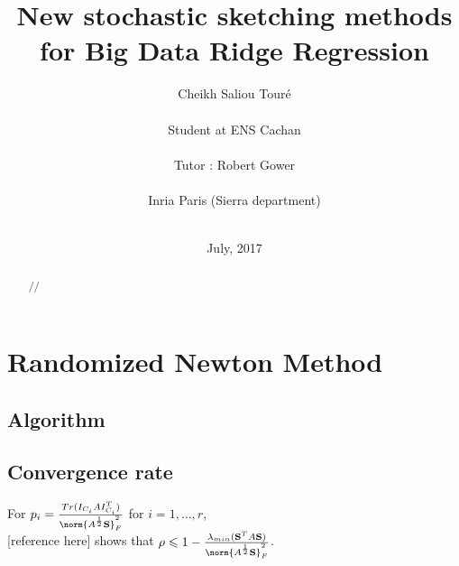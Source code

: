 




\title{New stochastic sketching methods for Big Data Ridge Regression}
\author{Cheikh Saliou Tour\'e \\ \\
Student at ENS Cachan\\\\
Tutor : Robert Gower \\ \\
Inria Paris (Sierra department)\\\\ }




\date{July, 2017}




\renewcommand\bibname{References}
\maketitle


\begin{abstract}

//

\end{abstract}
\tableofcontents
\newpage

\chapter{Randomized Newton Method}

%
%
%


\section{Algorithm}

\section{Convergence rate}


For $p_{i} = \frac{Tr(I_{C_{i}} A I_{C_{i}}^{T})}{\norm{A^{\frac 12} \bold{S} }^{2}_{F}}$ for $i = 1,\dots,r$,\\

 [reference here] shows that $\rho \leq 1 - \frac{\lambda_{min}(\bold{S}^{T}A\bold{S})}{\norm{A^{\frac 12} \bold{S} }^{2}_{F}}$.\\

